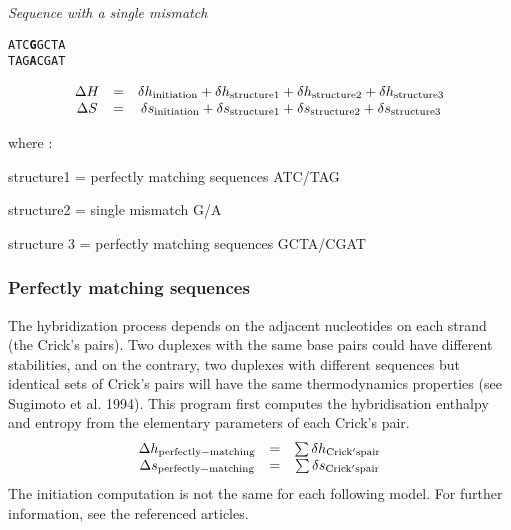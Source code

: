\documentclass{article}
\begin{document}
\textit{Sequence with a single mismatch} 
\begin{alltt}
ATC\textbf{G}GCTA
TAG\textbf{A}CGAT
\end{alltt}
\begin{displaymath}
  \begin{array}[t]{ccc}
  \Delta{}H&=&\delta{}h_\mathrm{initiation}+\delta{}h_\mathrm{structure1}+\delta{}h_\mathrm{structure2}+\delta{}h_\mathrm{structure3}\\
  \Delta{}S&=&\delta{}s_\mathrm{initiation}+\delta{}s_\mathrm{structure1}+\delta{}s_\mathrm{structure2}+\delta{}s_\mathrm{structure3}
  \end{array}
\end{displaymath}

where :

structure1 = perfectly matching sequences ATC/TAG

structure2 = single mismatch G/A

structure 3 = perfectly matching sequences GCTA/CGAT

\subsubsection{Perfectly matching sequences}

The hybridization process depends on the adjacent nucleotides on each strand (the Crick's pairs).  
Two duplexes with the same base pairs could have different stabilities, and on the contrary, two 
duplexes with different sequences but identical sets of Crick's pairs will have the same
thermodynamics properties (see Sugimoto et al. 1994).  This program first computes the hybridisation enthalpy 
and entropy from the elementary parameters of each Crick's pair.
\begin{displaymath}
  \begin{array}[t]{ccc}
  \Delta{}h_\mathrm{perfectly-matching}&=&\sum \delta{}h_\mathrm{Crick's pair}\\
  \Delta{}s_\mathrm{perfectly-matching}&=&\sum \delta{}s_\mathrm{Crick's pair}
  \end{array}
\end{displaymath}
The initiation computation is not the same for each following model. For further information, see the referenced articles.
\end{document}
